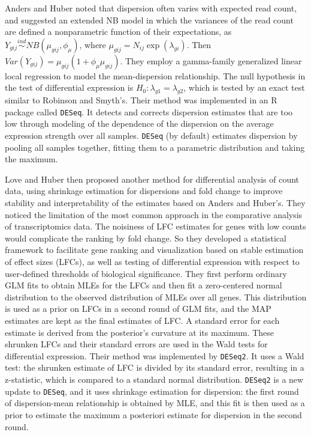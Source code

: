 Anders and Huber \citep{anders2010differential} noted that dispersion often varies with expected read count, and suggested an extended NB model in which the variances of the read count are defined a nonparametric function of their expectations, as $Y_{gij} \stackrel{ind}{\sim} NB(\mu_{gij}, \phi_\mu)$, where $\mu_{gij}=N_{ij}\exp(\lambda_{gi})$. Then $Var(Y_{gij}) = \mu_{gij}(1+\phi_\mu \mu_{gij})$. They employ a gamma-family generalized linear local regression to model the mean-dispersion relationship. The null hypothesis in the test of differential expression is $H_0: \lambda_{g1} = \lambda_{g2}$, which is tested by an exact test similar to Robinson and Smyth's. Their method was implemented in an R package called {\tt DESeq}. It detects and corrects dispersion estimates that are too low through modeling of the dependence of the dispersion on the average expression strength over all samples. {\tt DESeq} (by default) estimates dispersion by pooling all samples together, fitting them to a parametric distribution and taking the maximum.

Love and Huber \citep{love2014moderated} then proposed another method for differential analysis of count data, using shrinkage estimation for dispersions and fold change to improve stability and interpretability of the estimates based on Anders and Huber's. They noticed the limitation of the most common approach in the comparative analysis of transcriptomics data. The noisiness of LFC estimates for genes with low counts would complicate the ranking by fold change. So they developed a statistical framework to facilitate gene ranking and visualization based on stable estimation of effect sizes (LFCs), as well as testing of differential expression with respect to user-defined thresholds of biological significance. They first perform ordinary GLM fits to obtain MLEs for the LFCs and then fit a zero-centered normal distribution to the observed distribution of MLEs over all genes. This distribution is used as a prior on LFCs in a second round of GLM fits, and the MAP estimates are kept as the final estimates of LFC. A standard error for each estimate is derived from the posterior's curvature at its maximum. These shrunken LFCs and their standard errors are used in the Wald tests for differential expression. Their method was implemented by {\tt DESeq2}. It uses a Wald test: the shrunken estimate of LFC is divided by its standard error, resulting in a z-statistic, which is compared to a standard normal distribution. {\tt DESeq2} is a new update to {\tt DESeq}, and it uses shrinkage estimation for dispersion: the first round of dispersion-mean relationship is obtained by MLE, and this fit is then used as a prior to estimate the maximum a posteriori estimate for dispersion in the second round. 

